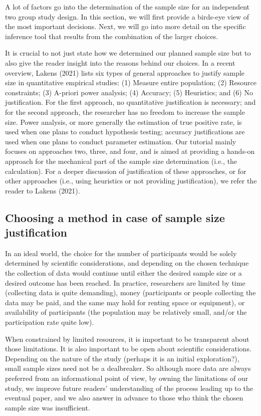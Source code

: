 \documentclass[
  english,
  man,floatsintext]{apa6}
\begin{document}
A lot of factors go into the determination of the sample size for an independent two group study design. In this section, we will first provide a birds-eye view of the most important decisions. Next, we will go into more detail on the specific inference tool that results from the combination of the larger choices.

It is crucial to not just state how we determined our planned sample size but to also give the reader insight into the reasons behind our choices. In a recent overview, Lakens (2021) lists six types of general approaches to justify sample size in quantitative empirical studies: (1) Measure entire population; (2) Resource constraints; (3) A-priori power analysis; (4) Accuracy; (5) Heuristics; and (6) No justification. For the first approach, no quantitative justification is necessary; and for the second approach, the researcher has no freedom to increase the sample size. Power analysis, or more generally the estimation of true positive rate, is used when one plans to conduct hypothesis testing; accuracy justifications are used when one plans to conduct parameter estimation. Our tutorial mainly focuses on approaches two, three, and four, and is aimed at providing a hands-on approach for the mechanical part of the sample size determination (i.e., the calculation). For a deeper discussion of justification of these approaches, or for other approaches (i.e., using heuristics or not providing justification), we refer the reader to Lakens (2021).

\hypertarget{choosing-a-method-in-case-of-sample-size-justification}{%
\subsection{Choosing a method in case of sample size justification}\label{choosing-a-method-in-case-of-sample-size-justification}}

In an ideal world, the choice for the number of participants would be solely determined by scientific considerations, and depending on the chosen technique the collection of data would continue until either the desired sample size or a desired outcome has been reached. In practice, researchers are limited by time (collecting data is quite demanding), money (participants or people collecting the data may be paid, and the same may hold for renting space or equipment), or availability of participants (the population may be relatively small, and/or the participation rate quite low).

When constrained by limited resources, it is important to be transparent about those limitations. It is also important to be open about scientific considerations. Depending on the nature of the study (perhaps it is an initial exploration?), small sample sizes need not be a dealbreaker. So although more data are always preferred from an informational point of view, by owning the limitations of our study, we improve future readers' understanding of the process leading up to the eventual paper, and we also answer in advance to those who think the chosen sample size was insufficient.
\end{document}
